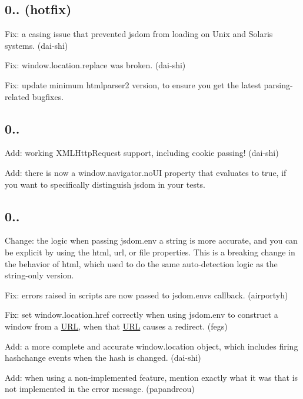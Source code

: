 \subsection*{0.. (hotfix)}


\begin{DoxyItemize}
\item Fix\+: a casing issue that prevented jsdom from loading on Unix and Solaris systems. (dai-\/shi)
\item Fix\+: {\ttfamily window.\+location.\+replace} was broken. (dai-\/shi)
\item Fix\+: update minimum htmlparser2 version, to ensure you get the latest parsing-\/related bugfixes.
\end{DoxyItemize}

\subsection*{0..}


\begin{DoxyItemize}
\item Add\+: working {\ttfamily X\+M\+L\+Http\+Request} support, including cookie passing! (dai-\/shi)
\item Add\+: there is now a {\ttfamily window.\+navigator.\+no\+UI} property that evaluates to true, if you want to specifically distinguish jsdom in your tests.
\end{DoxyItemize}

\subsection*{0..}


\begin{DoxyItemize}
\item Change\+: the logic when passing {\ttfamily jsdom.\+env} a string is more accurate, and you can be explicit by using the {\ttfamily html}, {\ttfamily url}, or {\ttfamily file} properties. This is a breaking change in the behavior of {\ttfamily html}, which used to do the same auto-\/detection logic as the string-\/only version.
\item Fix\+: errors raised in scripts are now passed to {\ttfamily jsdom.\+env}\textquotesingle{}s callback. (airportyh)
\item Fix\+: set {\ttfamily window.\+location.\+href} correctly when using {\ttfamily jsdom.\+env} to construct a window from a \mbox{\hyperlink{namespace_u_r_l}{U\+RL}}, when that \mbox{\hyperlink{namespace_u_r_l}{U\+RL}} causes a redirect. (fegs)
\item Add\+: a more complete and accurate {\ttfamily window.\+location} object, which includes firing {\ttfamily hashchange} events when the hash is changed. (dai-\/shi)
\item Add\+: when using a non-\/implemented feature, mention exactly what it was that is not implemented in the error message. (papandreou)
\end{DoxyItemize}

